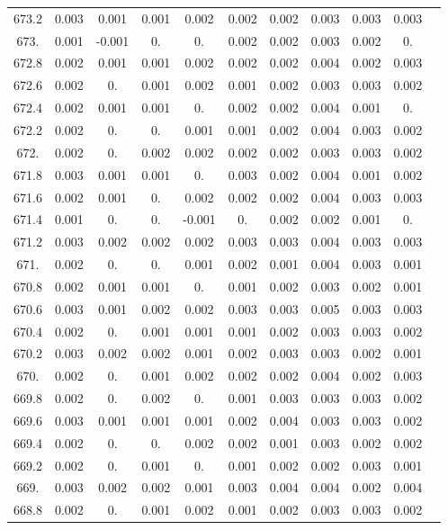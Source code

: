 \documentclass[12pt]{ctexart}
\numberwithin{equation}{section}
\begin{document}
\begin{longtable}{ccccccccccc}
673.2	&	0.003	&	0.001	&	0.001	&	0.002	&	0.002	&	0.002	&	0.003	&	0.003	&	0.003	\\
673.	&	0.001	&	-0.001	&	0.	&	0.	&	0.002	&	0.002	&	0.003	&	0.002	&	0.	\\
672.8	&	0.002	&	0.001	&	0.001	&	0.002	&	0.002	&	0.002	&	0.004	&	0.002	&	0.003	\\
672.6	&	0.002	&	0.	&	0.001	&	0.002	&	0.001	&	0.002	&	0.003	&	0.003	&	0.002	\\
672.4	&	0.002	&	0.001	&	0.001	&	0.	&	0.002	&	0.002	&	0.004	&	0.001	&	0.	\\
672.2	&	0.002	&	0.	&	0.	&	0.001	&	0.001	&	0.002	&	0.004	&	0.003	&	0.002	\\
672.	&	0.002	&	0.	&	0.002	&	0.002	&	0.002	&	0.002	&	0.003	&	0.003	&	0.002	\\
671.8	&	0.003	&	0.001	&	0.001	&	0.	&	0.003	&	0.002	&	0.004	&	0.001	&	0.002	\\
671.6	&	0.002	&	0.001	&	0.	&	0.002	&	0.002	&	0.002	&	0.004	&	0.003	&	0.003	\\
671.4	&	0.001	&	0.	&	0.	&	-0.001	&	0.	&	0.002	&	0.002	&	0.001	&	0.	\\
671.2	&	0.003	&	0.002	&	0.002	&	0.002	&	0.003	&	0.003	&	0.004	&	0.003	&	0.003	\\
671.	&	0.002	&	0.	&	0.	&	0.001	&	0.002	&	0.001	&	0.004	&	0.003	&	0.001	\\
670.8	&	0.002	&	0.001	&	0.001	&	0.	&	0.001	&	0.002	&	0.003	&	0.002	&	0.001	\\
670.6	&	0.003	&	0.001	&	0.002	&	0.002	&	0.003	&	0.003	&	0.005	&	0.003	&	0.003	\\
670.4	&	0.002	&	0.	&	0.001	&	0.001	&	0.001	&	0.002	&	0.003	&	0.003	&	0.002	\\
670.2	&	0.003	&	0.002	&	0.002	&	0.001	&	0.002	&	0.003	&	0.003	&	0.002	&	0.001	\\
670.	&	0.002	&	0.	&	0.001	&	0.002	&	0.002	&	0.002	&	0.004	&	0.002	&	0.003	\\
669.8	&	0.002	&	0.	&	0.002	&	0.	&	0.001	&	0.003	&	0.003	&	0.003	&	0.002	\\
669.6	&	0.003	&	0.001	&	0.001	&	0.001	&	0.002	&	0.004	&	0.003	&	0.003	&	0.002	\\
669.4	&	0.002	&	0.	&	0.	&	0.002	&	0.002	&	0.001	&	0.003	&	0.002	&	0.002	\\
669.2	&	0.002	&	0.	&	0.001	&	0.	&	0.001	&	0.002	&	0.002	&	0.003	&	0.001	\\
669.	&	0.003	&	0.002	&	0.002	&	0.001	&	0.003	&	0.004	&	0.004	&	0.002	&	0.004	\\
668.8	&	0.002	&	0.	&	0.001	&	0.002	&	0.001	&	0.002	&	0.003	&	0.003	&	0.002	\\

\end{longtable}
\end{document}
